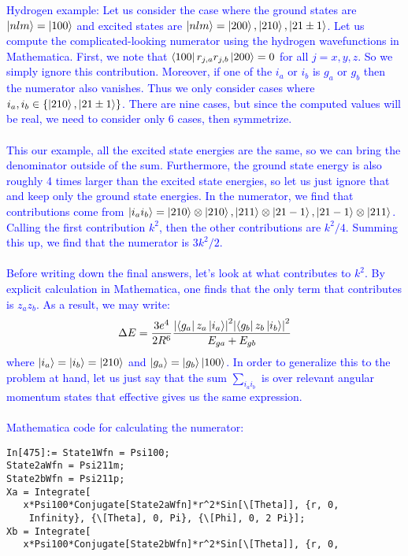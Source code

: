 \documentclass{article}
\theoremstyle{definition}
\newcommand{\f}[2]{\frac{#1}{#2}}
\begin{document}
\begin{enumerate}[label=(\alph*)]
\textcolor{blue}{Hydrogen example: Let us consider the case where the ground states are $\ket{nlm} = \ket{100}$ and excited states are $\ket{nlm} = \ket{200}, \ket{210}, \ket{21\pm1}$. Let us compute the complicated-looking numerator using the hydrogen wavefunctions in Mathematica.  First, we note that $\bra{100} r_{j,a} r_{j,b} \ket{200} = 0$ for all $j=x,y,z$. So we simply ignore this contribution. Moreover, if one of the $i_a$ or $i_b$ is $g_a$ or $g_b$ then the numerator also vanishes. Thus we only consider cases where $i_a, i_b \in \{ \ket{210}, \ket{21\pm 1} \}$. There are nine cases, but since the computed values will be real, we need to consider only 6 cases, then symmetrize. \\
\,\,\\ 
\noindent This our example, all the excited state energies are the same, so we can bring the denominator outside of the sum. Furthermore, the ground state energy is also roughly 4 times larger than the excited state energies, so let us just ignore that and keep only the ground state energies. In the numerator, we find that contributions come from $\ket{i_a i_b} = \ket{210}\otimes\ket{210}, \ket{211}\otimes\ket{21-1}, \ket{21-1}\otimes \ket{211}$. Calling the first contribution $k^2$, then the other contributions are $k^2/4$. Summing this up, we find that the numerator is $3k^2 /2$. \\
\,\,\\
\noindent Before writing down the final answers, let's look at what contributes to $k^2$. By explicit calculation in Mathematica, one finds that the only term that contributes is $z_a z_b$. As a result, we may write:
\begin{align*}
\Delta E = \f{3e^4}{2R^6} \f{ 
\abs{\bra{g_a} z_a \ket{i_a}}^2 
\abs{ \bra{g_b} z_b \ket{i_b} }^2
}{E_{ga} + E_{gb}}
\end{align*}
where $\ket{i_a} = \ket{i_b} = \ket{210}$ and $\ket{g_a} = \ket{g_b} \ket{100}$.  In order to generalize this to the problem at hand, let us just say that the sum $\sum_{i_ai_b}$ is over relevant angular momentum states that effective gives us the same expression. \\
\,\,\\
\noindent Mathematica code for calculating the numerator:}
\begin{lstlisting}
In[475]:= State1Wfn = Psi100;
State2aWfn = Psi211m;
State2bWfn = Psi211p;
Xa = Integrate[
   x*Psi100*Conjugate[State2aWfn]*r^2*Sin[\[Theta]], {r, 0, 
    Infinity}, {\[Theta], 0, Pi}, {\[Phi], 0, 2 Pi}];
Xb = Integrate[
   x*Psi100*Conjugate[State2bWfn]*r^2*Sin[\[Theta]], {r, 0, 

\end{lstlisting}
\end{enumerate}
\end{document}
